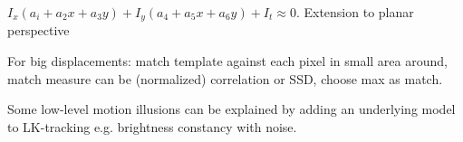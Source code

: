 \begin{definition}
  \(I_x(a_i + a_2x + a_3y) + I_y(a_4 + a_5x +a_6y) + I_t \approx 0\).
  Extension to planar perspective
\end{definition}

\begin{definition}
  For big displacements: match template against each pixel in small area around, match measure can be (normalized) correlation or SSD, choose max as match.
\end{definition}

\begin{definition}
  Some low-level motion illusions can be explained by adding an underlying model to LK-tracking e.g. brightness constancy with noise.
\end{definition}
